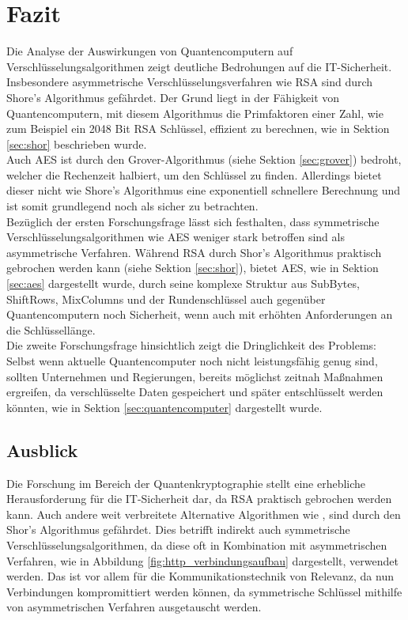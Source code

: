 \section{Fazit}
Die Analyse der Auswirkungen von Quantencomputern auf Verschlüsselungsalgorithmen
zeigt deutliche Bedrohungen auf die IT-Sicherheit. Insbesondere asymmetrische 
Verschlüsselungsverfahren wie RSA sind durch Shore's Algorithmus gefährdet. 
Der Grund liegt in der Fähigkeit von Quantencomputern, mit diesem Algorithmus
die Primfaktoren einer Zahl, wie zum Beispiel ein 2048 Bit RSA Schlüssel, 
effizient zu berechnen, wie in Sektion \ref{sec:shor} beschrieben wurde.\\
Auch AES ist durch den Grover-Algorithmus (siehe Sektion \ref{sec:grover}) bedroht, welcher die Rechenzeit 
halbiert, um den Schlüssel zu finden. Allerdings bietet dieser 
nicht wie Shore's Algorithmus eine exponentiell schnellere Berechnung und ist somit
grundlegend noch als sicher zu betrachten.\\
Bezüglich der ersten Forschungsfrage lässt sich festhalten, dass symmetrische 
Verschlüsselungsalgorithmen wie AES weniger stark betroffen sind als 
asymmetrische Verfahren. Während RSA durch Shor's Algorithmus praktisch 
gebrochen werden kann (siehe Sektion \ref{sec:shor}), bietet AES,
wie in Sektion \ref{sec:aes} dargestellt wurde, durch seine komplexe Struktur aus SubBytes, 
ShiftRows, MixColumns und der Rundenschlüssel auch gegenüber Quantencomputern 
noch Sicherheit, wenn auch mit erhöhten Anforderungen an die Schlüssellänge.\\
Die zweite Forschungsfrage hinsichtlich 
zeigt die Dringlichkeit des Problems: Selbst wenn 
aktuelle Quantencomputer noch nicht leistungsfähig 
genug sind, sollten Unternehmen und Regierungen, bereits möglichst zeitnah 
Maßnahmen ergreifen, da verschlüsselte Daten gespeichert 
und später entschlüsselt werden könnten, wie in Sektion 
\ref{sec:quantencomputer} dargestellt wurde.\\

\subsection{Ausblick}
Die Forschung im Bereich der Quantenkryptographie stellt eine erhebliche 
Herausforderung für die IT-Sicherheit dar, da RSA praktisch gebrochen werden 
kann. Auch andere weit verbreitete Alternative Algorithmen wie ,
sind durch den Shor's Algorithmus gefährdet. Dies betrifft indirekt auch symmetrische
Verschlüsselungsalgorithmen, da diese oft in Kombination 
mit asymmetrischen Verfahren, wie in Abbildung \ref{fig:http_verbindungsaufbau} dargestellt, 
verwendet werden. Das ist vor allem für die Kommunikationstechnik von Relevanz, da nun
Verbindungen kompromittiert werden können, da symmetrische Schlüssel mithilfe
von asymmetrischen Verfahren ausgetauscht werden.\\


